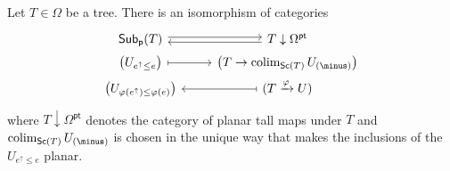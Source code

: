 \documentclass[a4paper,10pt]{article}%
\begin{document}
\begin{proposition}\label{SUBDATAUNDERPLAN PROP}
Let $T \in \Omega$ be a tree. There is an isomorphism of categories
\begin{equation}\label{SUBDATAUNDERPLAN EQ}
\begin{tikzcd}[row sep =0pt]
	\mathsf{Sub}_{\mathsf{p}}(T) \ar[r,shift left=2pt] &
	T \downarrow \Omega^{\mathsf{pt}} \ar[l,shift left=2pt]
\\
	\left(U_{e^{\uparrow} \leq e}\right) \ar[r,mapsto] & 
	\left(T \to \colim_{\mathsf{Sc}(T)} U_{(\minus)}\right)
\\
	\left(U_{\varphi(e^{\uparrow}) \leq \varphi(e)}\right) &
	(T \xrightarrow{\varphi} U) \ar[l,mapsto]
\end{tikzcd}
\end{equation}
where $T \downarrow \Omega^{\mathsf{pt}}$ denotes
the category of planar tall maps under $T$
and $\colim_{\mathsf{Sc}(T)} U_{(\minus)}$ is chosen in the unique way that makes the inclusions of the $U_{e^{\uparrow} \leq e}$ planar. 
\end{proposition}
\end{document}
